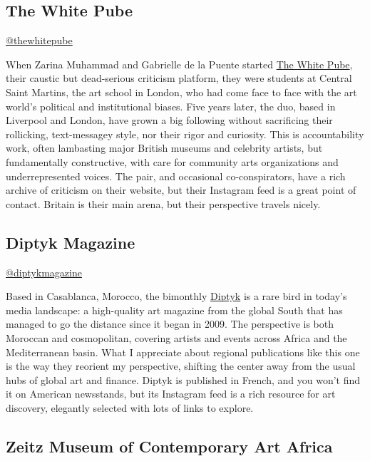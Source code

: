 \hypertarget{the-white-pube}{%
\subsection{The White Pube}\label{the-white-pube}}

\href{https://www.instagram.com/thewhitepube/}{@thewhitepube}

When Zarina Muhammad and Gabrielle de la Puente started
\href{https://www.thewhitepube.co.uk/}{The White Pube}, their caustic
but dead-serious criticism platform, they were students at Central Saint
Martins, the art school in London, who had come face to face with the
art world's political and institutional biases. Five years later, the
duo, based in Liverpool and London, have grown a big following without
sacrificing their rollicking, text-messagey style, nor their rigor and
curiosity. This is accountability work, often lambasting major British
museums and celebrity artists, but fundamentally constructive, with care
for community arts organizations and underrepresented voices. The pair,
and occasional co-conspirators, have a rich archive of criticism on
their website, but their Instagram feed is a great point of contact.
Britain is their main arena, but their perspective travels nicely.

\hypertarget{diptyk-magazine}{%
\subsection{Diptyk Magazine}\label{diptyk-magazine}}

\href{https://www.instagram.com/diptykmagazine/}{@diptykmagazine}

Based in Casablanca, Morocco, the bimonthly
\href{https://www.diptykmag.com/}{Diptyk} is a rare bird in today's
media landscape: a high-quality art magazine from the global South that
has managed to go the distance since it began in 2009. The perspective
is both Moroccan and cosmopolitan, covering artists and events across
Africa and the Mediterranean basin. What I appreciate about regional
publications like this one is the way they reorient my perspective,
shifting the center away from the usual hubs of global art and finance.
Diptyk is published in French, and you won't find it on American
newsstands, but its Instagram feed is a rich resource for art discovery,
elegantly selected with lots of links to explore.

\hypertarget{zeitz-museum-of-contemporary-art-africa}{%
\subsection{Zeitz Museum of Contemporary Art
Africa}\label{zeitz-museum-of-contemporary-art-africa}}

